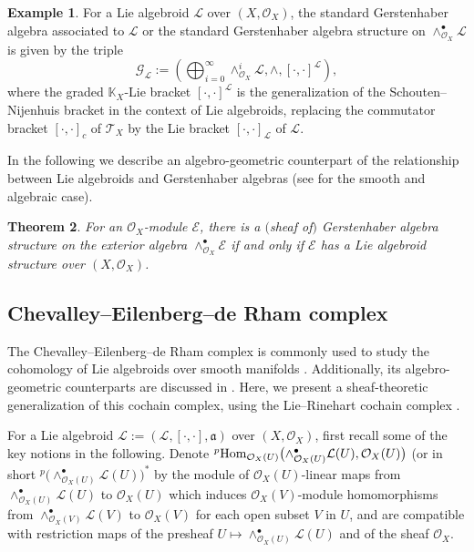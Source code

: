 \documentclass[pdftex]{sigma}
\numberwithin{equation}{section}
\newtheorem{Thm}{Theorem}[section]
\theoremstyle{definition}
\newtheorem{Exm}[Thm]{Example}
\begin{document}
\begin{Exm} \label{Lie alg to G-alg}
	For a Lie algebroid $\mathcal{L}$ over $(X,\mathcal{O}_X)$, the standard Gerstenhaber algebra associated to $\mathcal{L}$ or the standard Gerstenhaber algebra structure on $\wedge_{\mathcal{O}_X}^\bullet \mathcal{L}$ is given by the triple \[
\mathcal{G}_{\mathcal{L}}:=\left(\bigoplus^{\infty}_{i=0} \wedge_{\mathcal{O}_X}^i \mathcal{L}, \wedge, [\cdot,\cdot]^{\mathcal{L}}\right),
\]
 where the graded $\mathbb{K}_X$-Lie bracket $[\cdot,\cdot]^{\mathcal{L}}$ is the generalization of the Schouten--Nijenhuis bracket in the context of Lie algebroids, replacing the commutator bracket $[\cdot,\cdot]_c$ of $\mathcal{T}_X$ by the Lie bracket $[\cdot,\cdot]_{\mathcal{L}}$ of $\mathcal{L}$.
\end{Exm}

In the following we describe an algebro-geometric counterpart of the relationship between Lie algebroids and Gerstenhaber algebras (see \cite{JH1, PX} for the smooth and algebraic case).
\begin{Thm} \label{G-alg & Lie alg}
	For an $\mathcal{O}_X$-module $\mathcal{E}$, there is a $($sheaf of$)$ Gerstenhaber algebra structure on the exterior algebra $\wedge_{\mathcal{O}_X}^\bullet \mathcal{E}$ if and only if $\mathcal{E}$ has a Lie algebroid structure over $(X, \mathcal{O}_X)$.
\end{Thm}
\subsection{Chevalley--Eilenberg--de Rham complex} \label{C-E-d cohomology}
The Chevalley--Eilenberg--de Rham complex is commonly used to study the cohomology of Lie algebroids over smooth manifolds \cite{KM}. Additionally, its algebro-geometric counterparts are discussed in \cite{UB, BRT, BP}. Here, we present a sheaf-theoretic generalization of this cochain complex, using the Lie--Rinehart cochain complex \cite{GR}.

For a Lie algebroid $\mathcal{L}:=(\mathcal{L}, [\cdot, \cdot], \mathfrak{a})$ over $(X,\mathcal{O}_X)$, first recall some of the key notions in the following.
Denote $^p {\rm Hom}_{\mathcal{O}_X(U)}\bigl(\wedge^\bullet_{\mathcal{O}_X(U)}\mathcal{L}(U), \mathcal{O}_X(U)\bigr)$ (or in short $^p \bigl(\wedge^\bullet_{\mathcal{O}_X(U)}\mathcal{L}(U)\bigr)^*$ by the
module of $\mathcal{O}_X(U)$-linear maps from $\wedge^\bullet_{\mathcal{O}_X(U)}\mathcal{L}(U)$ to $\mathcal{O}_X(U)$ which induces $\mathcal{O}_X(V)$-module homomorphisms from $\wedge^\bullet_{\mathcal{O}_X(V)}\mathcal{L}(V)$ to $\mathcal{O}_X(V)$ for each open subset $V$ in $U$,
and are compatible with restriction maps of the presheaf $U \mapsto \wedge^\bullet_{\mathcal{O}_X(U)}\mathcal{L}(U)$ and of the sheaf $\mathcal{O}_X$.
\end{document}
